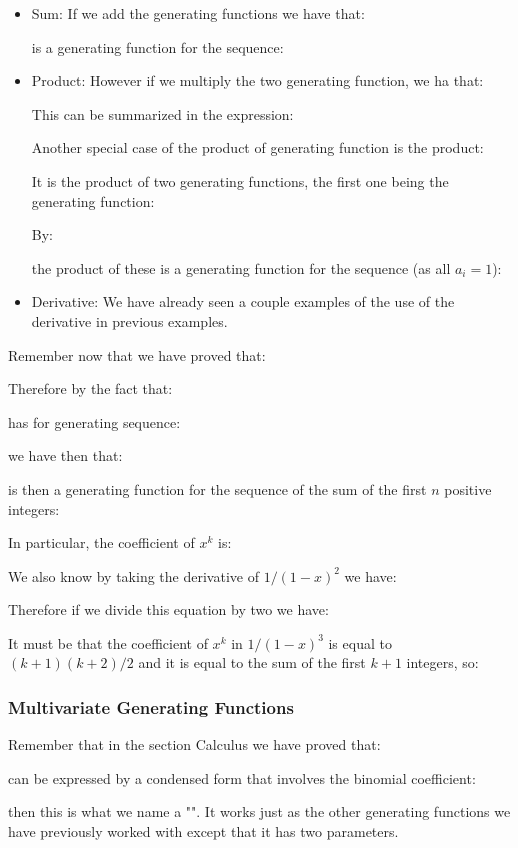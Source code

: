	\begin{itemize}
		\item Sum: If we add the generating functions we have that:
		
		is a generating function for the sequence:
		
		
		\item Product: However if we multiply the two generating function, we ha that:
		
		This can be summarized in the expression:
		
		Another special case of the product of generating function is the product:
		
		It is the product of two generating functions, the first one being the generating function:
		
		By:
		
		the product of these is a generating function for the sequence (as all $a_i=1$):
		
	
		\item Derivative: We have already seen a couple examples of the
use of the derivative in previous examples.
	\end{itemize}
	Remember now that we have proved that:
	
	Therefore by the fact that:
	
	has for generating sequence:
	
	we have then that:
	
	is then a generating function for the sequence of the sum of the first $n$ positive integers:
	
	In particular, the coefficient of $x^k$ is:
	
	We also know by taking the derivative of $1/(1-x)^2$ we have:
	
	Therefore if we divide this equation by two we have:
	
	It must be that the coefficient of $x^k$ in $1/(1-x)^3$ is equal to $(k + 1)(k + 2)/2$ and it is equal to the sum of the first $k+1$ integers, so:
	
	
	\subsubsection{Multivariate Generating Functions}
	Remember that in the section Calculus we have proved that:
	
	can be expressed by a condensed form that involves the binomial coefficient:
	
	then this is what we name a "". It works just as the other generating functions we have previously worked with except that it has two parameters.
	
